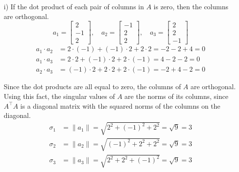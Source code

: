 \begin{homeworkProblem}
    \begin{solution}
        \begin{itemize}
            \item[i)] If the dot product of each pair of columns in $A$ is 
                zero, then the columns are orthogonal.
                \[
                    a_1 = \begin{bmatrix} 2 \\ -1 \\ 2 \end{bmatrix}, \quad
                    a_2 = \begin{bmatrix} -1 \\ 2 \\ 2 \end{bmatrix}, \quad
                    a_3 = \begin{bmatrix} 2 \\ 2 \\ -1 \end{bmatrix}
                \]
                \[
                    \begin{split}
                        a_1 \cdot a_2 &= 2 \cdot (-1) + (-1) \cdot 2 + 2 \cdot 2 = -2 - 2 + 4 = 0 \\
                        a_1 \cdot a_3 &= 2 \cdot 2 + (-1) \cdot 2 + 2 \cdot (-1) = 4 - 2 - 2 = 0 \\
                        a_2 \cdot a_3 &= (-1) \cdot 2 + 2 \cdot 2 + 2 \cdot (-1) = -2 + 4 - 2 = 0
                    \end{split}
                \]
                
                Since the dot products are all equal to zero, the columns of
                $A$ are orthogonal. Using this fact, the singular values of $A$
                are the norms of its columns, since $A^\top A$ is a diagonal 
                matrix with the squared norms of the columns on the diagonal.
                \[
                    \begin{split}
                        \sigma_1 &= \|a_1\| = \sqrt{2^2 + (-1)^2 + 2^2} = \sqrt{9} = 3 \\
                        \sigma_2 &= \|a_2\| = \sqrt{(-1)^2 + 2^2 + 2^2} = \sqrt{9} = 3 \\
                        \sigma_3 &= \|a_3\| = \sqrt{2^2 + 2^2 + (-1)^2} = \sqrt{9} = 3
                    \end{split}
                \]


\end{itemize}
\end{solution}
\end{homeworkProblem}

